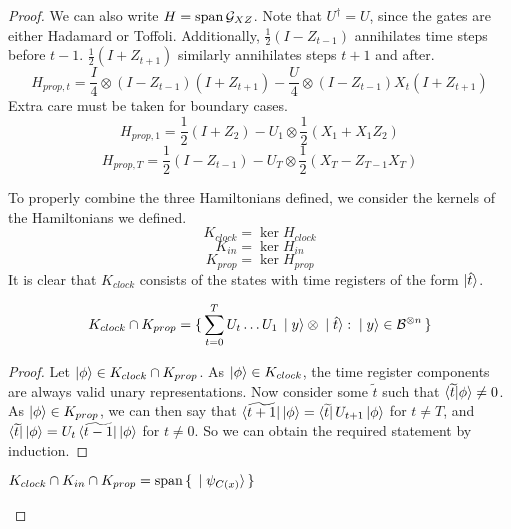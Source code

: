 \begin{proof}
	We can also write $H=\operatorname*{\operatorname{span}}\mathcal{G}_{XZ}$. Note that $U^\dagger=U$, since the gates are either Hadamard or Toffoli. Additionally, $\frac{1}{2}(I-Z_{t-1})$ annihilates time steps before $t-1$. $\frac{1}{2}(I+Z_{t+1})$ similarly annihilates steps $t+1$ and after.
	$$H_{prop,t}=\frac{I}{4}\otimes(I-Z_{t-1})(I+Z_{t+1})-\frac{U}{4}\otimes(I-Z_{t-1})X_t(I+Z_{t+1})$$
	Extra care must be taken for boundary cases.
	$$H_{prop,1}=\frac{1}{2}(I+Z_2)-U_1\otimes\frac{1}{2}(X_1+X_1Z_2)$$
	$$H_{prop,T}=\frac{1}{2}(I-Z_{t-1})-U_T\otimes\frac{1}{2}(X_T-Z_{T-1}X_T)$$

	To properly combine the three Hamiltonians defined, we consider the kernels of the Hamiltonians we defined.
	$$K_{clock}=\ker H_{clock}$$
	$$K_{in}=\ker H_{in}$$
	$$K_{prop}=\ker H_{prop}$$
	It is clear that $K_{clock}$ consists of the states with time registers of the form $\ket{\hat{t}}$.

	\begin{lemma}
		$$K_{clock}\cap K_{prop}=\set{\sum_{t=0}^TU_t\ldots U_1\ket{y}\otimes\ket{\hat{t}}: \ket{y}\in\mathcal{B}^{\otimes n}}$$
	\end{lemma}

	\begin{proof}
		Let $\ket\phi\in K_{clock}\cap K_{prop}$. As $\ket\phi\in K_{clock}$, the time register components are always valid unary representations. Now consider some $\widetilde{t}$ such that $\braket{\widetilde{t}|\phi}\ne0$. As $\ket\phi\in K_{prop}$, we can then say that $\bra{\widetilde{t+1}}\ket\phi=\bra{\widetilde{t}}U_{t+1}\ket\phi$ for $t\ne T$, and $\bra{\widetilde{t}}\ket\phi=U_t\bra{\widetilde{t-1}}\ket\phi$ for $t\ne0$. So we can obtain the required statement by induction.
	\end{proof}

	\begin{corollary}
		$K_{clock}\cap K_{in}\cap K_{prop}=\operatorname*{\operatorname{span}}\set{\ket{\psi_{C(x)}}}$
	\end{corollary}


\end{proof}
